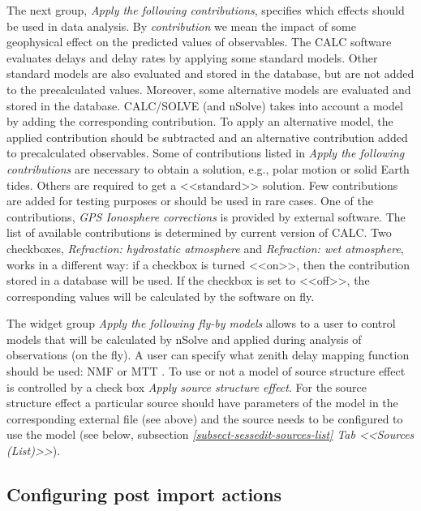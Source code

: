 \documentclass [10pt,letterpaper]{report}
\newcommand{\nuSolve}{\greektext n\latintext Solve}
\begin{document}
The next group, {\sl Apply the following contributions}, specifies
which effects should be used in data analysis. By {\it contribution} we
mean the impact of some geophysical effect on the predicted values of
observables. The CALC software evaluates delays and delay rates by
applying some standard models. Other standard models are also evaluated
and stored in the database, but are not added to the precalculated
values. Moreover, some alternative models are evaluated and stored in
the database. CALC/SOLVE (and \nuSolve{}) takes into account a model by
adding the corresponding contribution. To apply an alternative model,
the applied contribution should be subtracted and an alternative
contribution added to precalculated observables. Some of contributions
listed in {\sl Apply the following contributions} are necessary to
obtain a solution, e.g., polar motion or solid Earth tides. Others are
required to get a <<standard>> solution. Few contributions are added
for testing purposes or should be used in rare cases. One of the contributions,
{\sl GPS Ionosphere corrections} is provided by external software.
The list of available contributions is determined by current version of CALC.
Two checkboxes, {\sl Refraction: hydrostatic atmosphere} and
{\sl Refraction: wet atmosphere}, works in a different way: if a
checkbox is turned <<on>>, then the contribution stored in a database
will be used. If the checkbox is set to <<off>>, the corresponding
values will be calculated by the software on fly.

The widget group {\sl Apply the following fly-by models} allows to a
user to control models that will be calculated by \nuSolve{} and applied
during analysis of observations (on the fly). A user can specify
what zenith delay mapping function should be used: NMF \cite{Niell1996}
or MTT \cite{Herring1992}. To use or not a model of source structure
effect is controlled by a check box {\sl Apply source structure effect}.
For the source structure effect a particular source should have parameters
of the model in the corresponding external file (see above) and the
source needs to be configured to use the model (see below, subsection
\emph{\ref{subsect-sessedit-sources-list} Tab <<Sources (List)>>}).


\subsection{Configuring post import actions}
\label{subsect-config-pia}
\end{document}

